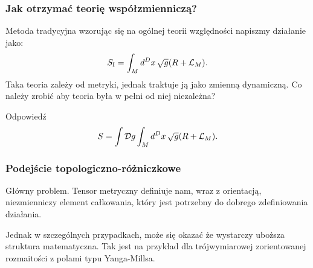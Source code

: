 \documentclass[10pt,t]{beamer}
\begin{document}
\begin{frame}
  \frametitle{Jak otrzymać teorię współzmienniczą?}


  Metoda tradycyjna wzorując się na ogólnej teorii względności napiszmy
  działanie jako:
  \begin{equation}
    \label{eq:Ogolna-wspolzmienniczosc-01}
    S_{ \mathrm{I} } =
    \int_{ M } d^{ D } x \, \sqrt{ g } ( R + \mathcal{L}_{ M } ).
  \end{equation}
  Taka teoria zależy od metryki, jednak traktuje ją jako zmienną
  dynamiczną. Co należy zrobić aby teoria była w pełni od niej
  niezależna?

  Odpowiedź
  \begin{equation}
    \label{eq:Ogolna-wspolzmienniczosc-02}
    S =
    \int \mathcal{D} g \int_{ M } d^{ D } x \, \sqrt{ g } ( R + \mathcal{L}_{ M } ).
  \end{equation}

\end{frame}





\begin{frame}
  \frametitle{Podejście topologiczno-różniczkowe}


  Główny problem.
  Tensor metryczny definiuje nam, wraz z orientacją, niezmienniczy
  element całkowania, który jest potrzebny do dobrego zdefiniowania
  działania.

  Jednak w szczególnych przypadkach, może się okazać że wystarczy
  uboższa struktura matematyczna. Tak jest na przykład dla
  trójwymiarowej zorientowanej rozmaitości z polami typu Yanga-Millsa.

\end{frame}
\end{document}
